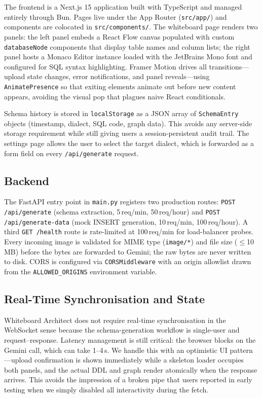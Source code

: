 \documentclass[conference]{IEEEtran}
\begin{document}
The frontend is a Next.js 15 application built with TypeScript and
managed entirely through Bun. Pages live under the App Router
(\texttt{src/app/}) and components are colocated in
\texttt{src/components/}. The whiteboard page renders two panels:
the left panel embeds a React Flow canvas populated with custom
\texttt{databaseNode} components that display table names and
column lists; the right panel hosts a Monaco Editor instance
loaded with the JetBrains Mono font and configured for SQL
syntax highlighting. Framer Motion drives all transitions---upload
state changes, error notifications, and panel reveals---using
\texttt{AnimatePresence} so that exiting elements animate out
before new content appears, avoiding the visual pop that plagues
naive React conditionals.

Schema history is stored in \texttt{localStorage} as a
JSON array of \texttt{SchemaEntry} objects (timestamp, dialect,
SQL code, graph data). This avoids any server-side storage
requirement while still giving users a session-persistent
audit trail. The settings page allows the user to select the
target dialect, which is forwarded as a form field on every
\texttt{/api/generate} request.

\subsection{Backend}

The FastAPI entry point in \texttt{main.py} registers two
production routes: \texttt{POST /api/generate} (schema extraction,
5\,req/min, 50\,req/hour) and \texttt{POST /api/generate-data}
(mock INSERT generation, 10\,req/min, 100\,req/hour). A third
\texttt{GET /health} route is rate-limited at 100\,req/min for
load-balancer probes. Every incoming image is validated for
MIME type (\texttt{image/*}) and file size ($\leq$10\,MB) before
the bytes are forwarded to Gemini; the raw bytes are never written
to disk. CORS is configured via \texttt{CORSMiddleware} with an
origin allowlist drawn from the \texttt{ALLOWED\_ORIGINS} environment
variable.

\subsection{Real-Time Synchronisation and State}

Whiteboard Architect does not require real-time synchronisation
in the WebSocket sense because the schema-generation workflow
is single-user and request--response. Latency management is still
critical: the browser blocks on the Gemini call, which can take
1--4\,s. We handle this with an optimistic UI pattern---upload
confirmation is shown immediately while a skeleton loader
occupies both panels, and the actual DDL and graph render
atomically when the response arrives. This avoids the impression
of a broken pipe that users reported in early testing when we
simply disabled all interactivity during the fetch.
\end{document}
